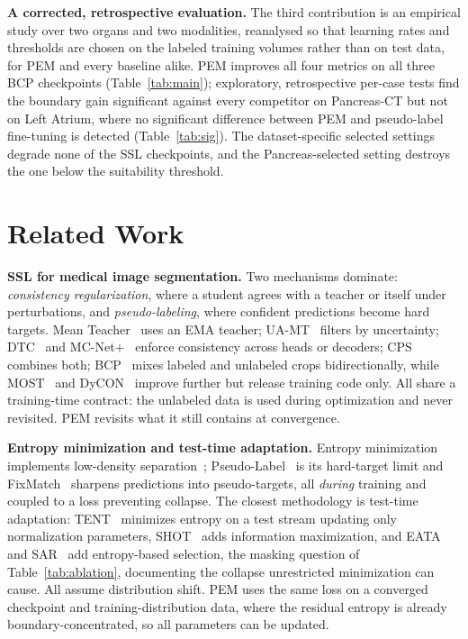 \documentclass[conference]{IEEEtran}
\begin{document}
\noindent\textbf{A corrected, retrospective evaluation.}
The third contribution is an empirical study over two organs and two modalities, reanalysed so that learning rates and thresholds are chosen on the labeled training volumes rather than on test data, for PEM and every baseline alike. PEM improves all four metrics on all three BCP checkpoints (Table~\ref{tab:main}); exploratory, retrospective per-case tests find the boundary gain significant against every competitor on Pancreas-CT but not on Left Atrium, where no significant difference between PEM and pseudo-label fine-tuning is detected (Table~\ref{tab:sig}). The dataset-specific selected settings degrade none of the SSL checkpoints, and the Pancreas-selected setting destroys the one below the suitability threshold.

\section{Related Work}
\label{sec:related}
\noindent\textbf{SSL for medical image segmentation.}
Two mechanisms dominate: \emph{consistency regularization}, where a student agrees with a teacher or itself under perturbations, and \emph{pseudo-labeling}, where confident predictions become hard targets. Mean Teacher~\cite{tarvainen2017meanteacher} uses an EMA teacher; UA-MT~\cite{yu2019uamt} filters by uncertainty; DTC~\cite{luo2022dtc} and MC-Net+~\cite{wu2022mcnet} enforce consistency across heads or decoders; CPS~\cite{chen2021cps} combines both; BCP~\cite{bai2023bcp} mixes labeled and unlabeled crops bidirectionally, while MOST~\cite{liu2024most} and DyCON~\cite{assefa2025dycon} improve further but release training code only. All share a training-time contract: the unlabeled data is used during optimization and never revisited. PEM revisits what it still contains at convergence.

\noindent\textbf{Entropy minimization and test-time adaptation.}
Entropy minimization~\cite{grandvalet2004entropy} implements low-density separation~\cite{chapelle2006ssl}; Pseudo-Label~\cite{lee2013pseudolabel} is its hard-target limit and FixMatch~\cite{sohn2020fixmatch} sharpens predictions into pseudo-targets, all \emph{during} training and coupled to a loss preventing collapse. The closest methodology is test-time adaptation: TENT~\cite{wang2021tent} minimizes entropy on a test stream updating only normalization parameters, SHOT~\cite{liang2020shot} adds information maximization, and EATA~\cite{niu2022eata} and SAR~\cite{niu2023sar} add entropy-based selection, the masking question of Table~\ref{tab:ablation}, documenting the collapse unrestricted minimization can cause. All assume distribution shift. PEM uses the same loss on a converged checkpoint and training-distribution data, where the residual entropy is already boundary-concentrated, so all parameters can be updated.
\end{document}
